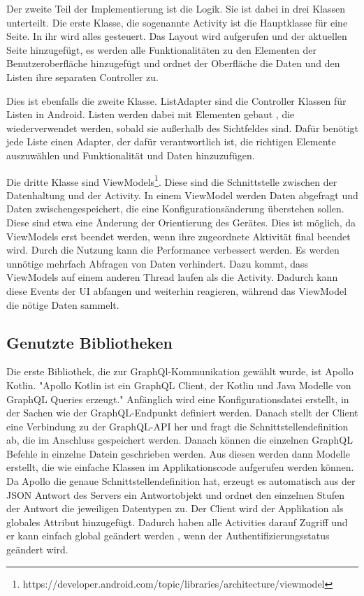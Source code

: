 Der zweite Teil der Implementierung ist die Logik. Sie ist dabei in drei Klassen unterteilt. 
Die erste Klasse, die sogenannte Activity ist die Hauptklasse für eine Seite. In ihr wird alles gesteuert. Das Layout wird aufgerufen und der aktuellen Seite hinzugefügt, es werden alle Funktionalitäten zu den Elementen der Benutzeroberfläche hinzugefügt und ordnet der Oberfläche die Daten und den Listen ihre separaten Controller zu.

Dies ist ebenfalls die zweite Klasse. ListAdapter sind die Controller Klassen für Listen in Android. Listen werden dabei mit Elementen gebaut , die wiederverwendet werden, sobald sie außerhalb des Sichtfeldes sind. Dafür benötigt jede Liste einen Adapter, der dafür verantwortlich ist, die richtigen Elemente auszuwählen und Funktionalität und Daten hinzuzufügen.

Die dritte Klasse sind ViewModels\footnote{https://developer.android.com/topic/libraries/architecture/viewmodel}. Diese sind die Schnittstelle zwischen der Datenhaltung und der Activity. In einem ViewModel werden Daten abgefragt und Daten zwischengespeichert, die eine Konfigurationsänderung überstehen sollen. Diese sind etwa eine Änderung der Orientierung des Gerätes. Dies ist möglich, da ViewModels erst beendet werden, wenn ihre zugeordnete Aktivität final beendet wird. 
Durch die Nutzung kann die Performance verbessert werden. Es werden unnötige mehrfach Abfragen von Daten verhindert. Dazu kommt, dass ViewModels auf einem anderen Thread laufen als die Activity. Dadurch kann diese Events der \ac{UI} abfangen und weiterhin reagieren, während das ViewModel die nötige Daten sammelt.


\subsection{Genutzte Bibliotheken}
Die erste Bibliothek, die zur GraphQl-Kommunikation gewählt wurde, ist Apollo Kotlin. 
"Apollo Kotlin ist ein GraphQL Client, der Kotlin und Java Modelle von GraphQL Queries erzeugt."\cite{Apollo_kotlin_docs} 
Anfänglich wird eine Konfigurationsdatei erstellt, in der Sachen wie der GraphQL-Endpunkt definiert werden. 
Danach stellt der Client eine Verbindung zu der GraphQL-\ac{API} her und fragt die Schnittstellendefinition ab, die im Anschluss gespeichert werden. 
Danach können die einzelnen GraphQL Befehle in einzelne Datein geschrieben werden. Aus diesen werden dann Modelle erstellt, die wie einfache Klassen im Applikationscode aufgerufen werden können.
Da Apollo die genaue Schnittstellendefinition hat, erzeugt es automatisch aus der \ac{JSON} Antwort des Servers ein Antwortobjekt und ordnet den einzelnen Stufen der Antwort die jeweiligen Datentypen zu.
Der Client wird der Applikation als globales Attribut hinzugefügt. Dadurch haben alle Activities darauf Zugriff und er kann einfach global geändert werden , wenn der Authentifizierungsstatus geändert wird.

